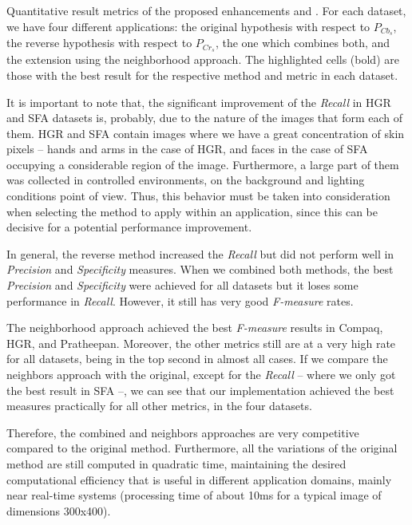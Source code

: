 \begin{table*}[ht]
\caption[Quantitative result metrics of the proposed enhancements and original method]{Quantitative result metrics of the proposed enhancements and \citet{brancati:17}. For each dataset, we have four different applications: the original hypothesis with respect to $P_{Cb_{s}}$, the reverse hypothesis with respect to $P_{Cr_{s}}$, the one which combines both, and the extension using the neighborhood approach. The highlighted cells (bold) are those with the best result for the respective method and metric in each dataset.}
\label{tab:merged_rules_results}

\end{table*}

It is important to note that, the significant improvement of the \textit{Recall} in HGR and SFA datasets is, probably, due to the nature of the images that form each of them. HGR and SFA contain images where we have a great concentration of skin pixels -- hands and arms in the case of HGR, and faces in the case of SFA occupying a considerable region of the image. Furthermore, a large part of them was collected in controlled environments, on the background and lighting conditions point of view. Thus, this behavior must be taken into consideration when selecting the method to apply within an application, since this can be decisive for a potential performance improvement.

In general, the reverse method increased the \textit{Recall} but did not perform well in \textit{Precision} and \textit{Specificity} measures. When we combined both methods, the best \textit{Precision} and \textit{Specificity} were achieved for all datasets but it loses some performance in \textit{Recall}. However, it still has very good \textit{F-measure} rates.

The neighborhood approach achieved the best \textit{F-measure} results in Compaq, HGR, and Pratheepan. Moreover, the other metrics still are at a very high rate for all datasets, being in the top second in almost all cases. If we compare the neighbors approach with the original, except for the \textit{Recall} -- where we only got the best result in SFA --, we can see that our implementation achieved the best measures practically for all other metrics, in the four datasets.

Therefore, the combined and neighbors approaches are very competitive compared to the original method. Furthermore, all the variations of the original method are still computed in quadratic time, maintaining the desired computational efficiency that is useful in different application domains, mainly near real-time systems (processing time of about 10ms for a typical image of dimensions 300x400).

